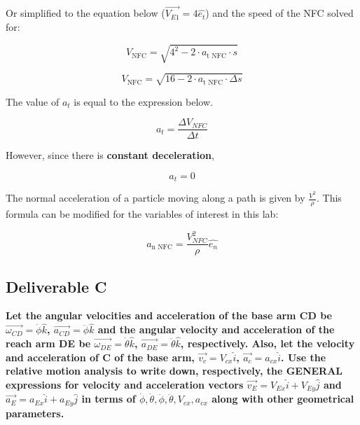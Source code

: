 \documentclass[12pt, a4paper]{article}
\begin{document}
Or simplified to the equation below ($\vec{V_{E1}} = 4\hat{e_t}$) and the speed of the NFC solved for:

\begin{equation}
    V_{\text{NFC}} = \sqrt{4^2 - 2 \cdot a_{\text{t NFC}}\cdot s}
\end{equation}

\begin{equation}
    V_{\text{NFC}} = \sqrt{16 - 2 \cdot a_{\text{t NFC}}\cdot \Delta s}
\end{equation}

The value of $a_t$ is equal to the expression below.

\begin{equation}
    a_t = \frac{\Delta V_{NFC}}{\Delta t}
\end{equation}

However, since there is \textbf{constant deceleration}, 

\begin{equation}
    a_t = 0
\end{equation}

The normal acceleration of a particle moving along a path is given by $\frac{V^2}{\rho}$. This formula can be modified for the variables of interest in this lab:

\begin{equation}
    a_{\text{n NFC}} = \frac{V_{NFC}^2}{\rho} \hat{e_n}
\end{equation}

\newpage
\subsection{Deliverable C}

\textbf{Let the angular velocities and acceleration of the base arm CD be $\vec{\omega_{CD}}=\dot\phi \hat{k}$, $\vec{a_{CD}}=\ddot\phi \hat{k}$ and the angular velocity and acceleration of the reach arm DE be $\vec{\omega_{DE}}=\dot\theta \hat{k}$, $\vec{a_{DE}}=\ddot\theta \hat{k}$, respectively. Also, let the velocity and acceleration of C of the base arm, $\vec{v_c} = V_{cx}\hat{i}$, $\vec{a_c} = a_{cx}\hat{i}$. Use the relative motion analysis to write down, respectively, the GENERAL expressions for velocity and acceleration vectors $\vec{v_E} = V_{Ex}\hat{i} + V_{Ey}\hat{j}$ and $\vec{a_E} = a_{Ex}\hat{i} + a_{Ey}\hat{j}$ in terms of $\dot\phi, \dot\theta, \ddot\phi, \ddot\theta, V_{cx}, a_{cx}$ along with other geometrical parameters.} \\
\end{document}
